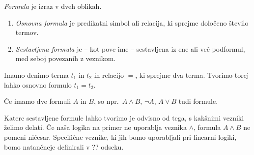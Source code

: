 \begin{definicija} \label{formula}
	\emph{Formula} je izraz v dveh oblikah.
	\begin{enumerate}
        \item \emph{Osnovna formula} je predikatni simbol ali relacija, ki sprejme določeno število termov.
        \item \emph{Sestavljena formula} je -- kot pove ime -- sestavljena iz ene ali več podformul, med seboj povezanih z veznikom.
	\end{enumerate}
\end{definicija}
\begin{primer*}
    Imamo denimo terma $t_1$ in $t_2$ in relacijo $=$, ki sprejme dva terma. Tvorimo torej lahko osnovno formulo $t_1=t_2$.
\end{primer*}
\begin{primer*}
    Če imamo dve formuli $A$ in $B$, so npr.\ $A \land B$, $\neg A$, $A \lor B$ tudi formule.
\end{primer*}
Katere sestavljene formule lahko tvorimo je odvisno od tega, s kakšnimi vezniki želimo delati. Če naša logika na primer ne uporablja veznika $\land$, formula $A \land B$ ne pomeni ničesar. Specifične veznike, ki jih bomo uporabljali pri linearni logiki, bomo natančneje definirali v ?? odseku.
